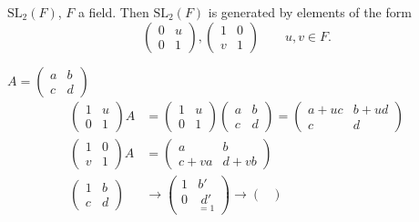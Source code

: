 \documentclass[10pt, a4paper]{article}
\begin{document}
\begin{problem}
    $\mathrm{SL}_2(F)$,
    $F$ a field.
    Then $\mathrm{SL}_2(F)$ is generated by elements of the form
    \[
    \begin{pmatrix}
        0 & u \\ 0 & 1
    \end{pmatrix},
    \begin{pmatrix}
        1 & 0 \\ v & 1
    \end{pmatrix}\qquad
    u, v \in F.
    \]

    \begin{solution}
        $A = \begin{pmatrix}
            a & b \\ c & d
        \end{pmatrix}$
        \begin{align*}
            \begin{pmatrix}
                1 & u \\ 0 & 1
            \end{pmatrix}A &= \begin{pmatrix}
                1 & u \\ 0 & 1
            \end{pmatrix}\begin{pmatrix}
                a & b \\ c & d
            \end{pmatrix} = \begin{pmatrix}
                a + uc & b + ud \\
                c & d
            \end{pmatrix} \\
            \begin{pmatrix}
                1 & 0 \\ v & 1
            \end{pmatrix}A &= \begin{pmatrix}
                a & b \\ c + va & d + vb
            \end{pmatrix} \\
            \begin{pmatrix}
                1 & b \\ c & d
            \end{pmatrix} & \to \begin{pmatrix}
                1 & b' \\ 0 & \underset{=1}{d'}
            \end{pmatrix} \to \begin{pmatrix}

\end{pmatrix}
\end{align*}
\end{solution}
\end{problem}
\end{document}
